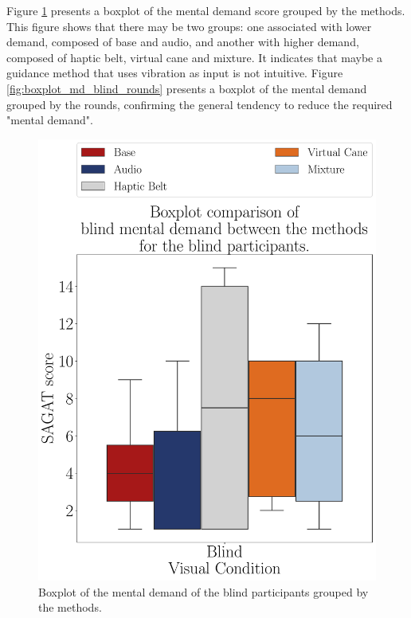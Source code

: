 Figure \ref{fig:boxplot_md_blind_scene}  presents a boxplot of the mental demand score grouped by the methods. This figure shows that there may be two groups: one associated with lower demand, composed of base and audio, and another with higher demand, composed of haptic belt, virtual cane and mixture. It indicates that maybe a guidance method that uses vibration as input is not intuitive. Figure \ref{fig:boxplot_md_blind_rounds} presents a boxplot of the mental demand grouped by the rounds, confirming the general tendency to reduce the required "mental demand". 

\begin{figure}[!htb]
    \centering
    \begin{minipage}{0.45\textwidth}
        \centering
        \includegraphics[width = \textwidth]{Resultados/Nasa/Figuras/pdf/boxplot_md_blind_scene.pdf}
        \caption{Boxplot of the mental demand of the blind participants grouped by the methods.}
        \label{fig:boxplot_md_blind_scene}
    \end{minipage}

\end{figure}
